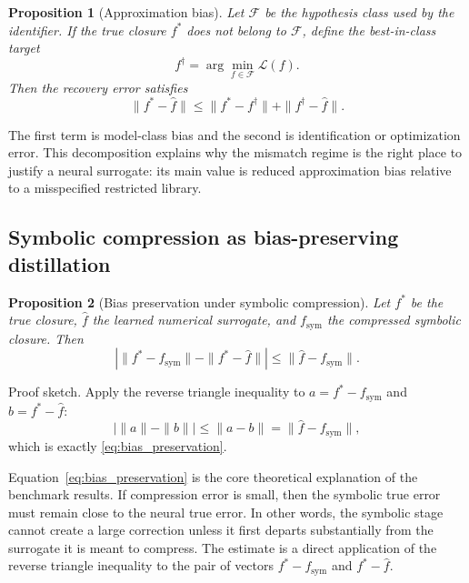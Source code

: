\documentclass[preprint,12pt]{elsarticle}
\newtheorem{proposition}{Proposition}
\begin{document}
\begin{proposition}[Approximation bias]
Let $\mathcal{F}$ be the hypothesis class used by the identifier. If the true closure $f^\ast$ does not belong to $\mathcal{F}$, define the best-in-class target
\begin{equation}
f^\dagger = \arg \min_{f \in \mathcal{F}} \mathcal{L}(f).
\end{equation}
Then the recovery error satisfies
\begin{equation}
\|f^\ast - \widehat{f}\|
\le
\|f^\ast - f^\dagger\|
+ \|f^\dagger - \widehat{f}\|.
\end{equation}
\end{proposition}

The first term is model-class bias and the second is identification or optimization error. This decomposition explains why the mismatch regime is the right place to justify a neural surrogate: its main value is reduced approximation bias relative to a misspecified restricted library.

\subsection{Symbolic compression as bias-preserving distillation}

\begin{proposition}[Bias preservation under symbolic compression]
Let $f^\ast$ be the true closure, $\widehat{f}$ the learned numerical surrogate, and $f_{\text{sym}}$ the compressed symbolic closure. Then
\begin{equation}
\left| \|f^\ast - f_{\text{sym}}\| - \|f^\ast - \widehat{f}\| \right|
\le
\|\widehat{f} - f_{\text{sym}}\|.
\label{eq:bias_preservation}
\end{equation}
\end{proposition}

Proof sketch. Apply the reverse triangle inequality to $a=f^\ast-f_{\text{sym}}$ and $b=f^\ast-\widehat{f}$:
\begin{equation}
\bigl| \|a\| - \|b\| \bigr| \le \|a-b\| = \|\widehat{f}-f_{\text{sym}}\|,
\end{equation}
which is exactly \eqref{eq:bias_preservation}.

Equation~\eqref{eq:bias_preservation} is the core theoretical explanation of the benchmark results. If compression error is small, then the symbolic true error must remain close to the neural true error. In other words, the symbolic stage cannot create a large correction unless it first departs substantially from the surrogate it is meant to compress.
The estimate is a direct application of the reverse triangle inequality to the pair of vectors $f^\ast-f_{\text{sym}}$ and $f^\ast-\widehat{f}$.
\end{document}
